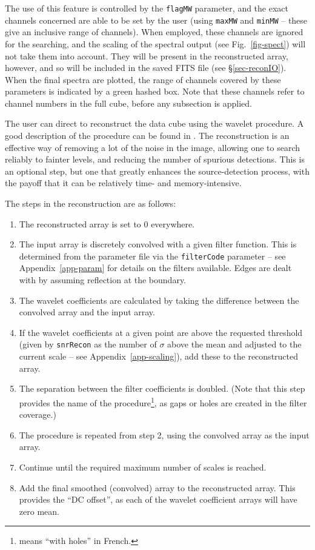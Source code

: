 The use of this feature is controlled by the \texttt{flagMW}
parameter, and the exact channels concerned are able to be set by the
user (using \texttt{maxMW} and \texttt{minMW} -- these give an
inclusive range of channels). When employed, these channels are
ignored for the searching, and the scaling of the spectral output (see
Fig.~\ref{fig-spect}) will not take them into account. They will be
present in the reconstructed array, however, and so will be included
in the saved FITS file (see \S\ref{sec-reconIO}). When the final
spectra are plotted, the range of channels covered by these parameters
is indicated by a green hashed box. Note that these channels refer to
channel numbers in the full cube, before any subsection is applied.

\label{sec-recon}

The user can direct \duchamp to reconstruct the data cube using the
\atrous wavelet procedure. A good description of the procedure can be
found in \citet{starck02a}. The reconstruction is an effective way
of removing a lot of the noise in the image, allowing one to search
reliably to fainter levels, and reducing the number of spurious
detections. This is an optional step, but one that greatly enhances
the source-detection process, with the payoff that it can be
relatively time- and memory-intensive.


The steps in the \atrous reconstruction are as follows:
\begin{enumerate}
\item The reconstructed array is set to 0 everywhere.
\item The input array is discretely convolved with a given filter
  function. This is determined from the parameter file via the
  \texttt{filterCode} parameter -- see Appendix~\ref{app-param} for
  details on the filters available. Edges are dealt with by assuming
  reflection at the boundary.
\item The wavelet coefficients are calculated by taking the difference
  between the convolved array and the input array.
\item If the wavelet coefficients at a given point are above the
  requested threshold (given by \texttt{snrRecon} as the number of
  $\sigma$ above the mean and adjusted to the current scale -- see
  Appendix~\ref{app-scaling}), add these to the reconstructed array.
\item The separation between the filter coefficients is doubled. (Note
  that this step provides the name of the procedure\footnote{\atrous
  means ``with holes'' in French.}, as gaps or holes are created in
  the filter coverage.)
\item The procedure is repeated from step 2, using the convolved array
  as the input array.
\item Continue until the required maximum number of scales is reached.
\item Add the final smoothed (\ie convolved) array to the
  reconstructed array. This provides the ``DC offset'', as each of the
  wavelet coefficient arrays will have zero mean.
\end{enumerate}

